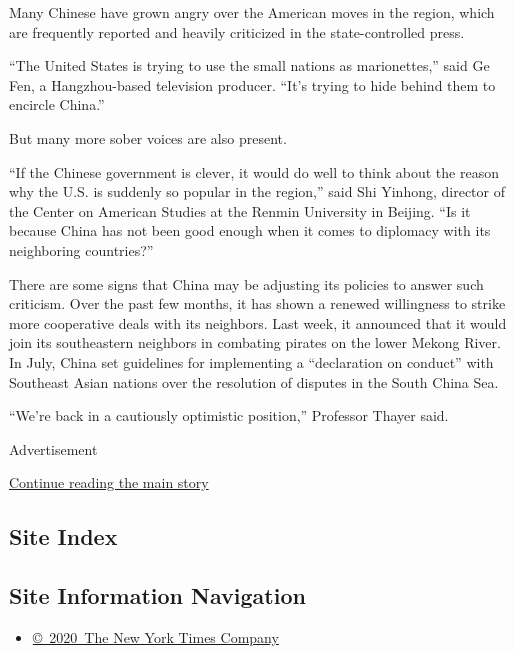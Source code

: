 Many Chinese have grown angry over the American moves in the region,
which are frequently reported and heavily criticized in the
state-controlled press.

``The United States is trying to use the small nations as marionettes,''
said Ge Fen, a Hangzhou-based television producer. ``It's trying to hide
behind them to encircle China.''

But many more sober voices are also present.

``If the Chinese government is clever, it would do well to think about
the reason why the U.S. is suddenly so popular in the region,'' said Shi
Yinhong, director of the Center on American Studies at the Renmin
University in Beijing. ``Is it because China has not been good enough
when it comes to diplomacy with its neighboring countries?''

There are some signs that China may be adjusting its policies to answer
such criticism. Over the past few months, it has shown a renewed
willingness to strike more cooperative deals with its neighbors. Last
week, it announced that it would join its southeastern neighbors in
combating pirates on the lower Mekong River. In July, China set
guidelines for implementing a ``declaration on conduct'' with Southeast
Asian nations over the resolution of disputes in the South China Sea.

``We're back in a cautiously optimistic position,'' Professor Thayer
said.

Advertisement

\protect\hyperlink{after-bottom}{Continue reading the main story}

\hypertarget{site-index}{%
\subsection{Site Index}\label{site-index}}

\hypertarget{site-information-navigation}{%
\subsection{Site Information
Navigation}\label{site-information-navigation}}

\begin{itemize}
\tightlist
\item
  \href{https://help.nytimes3xbfgragh.onion/hc/en-us/articles/115014792127-Copyright-notice}{©~2020~The
  New York Times Company}
\end{itemize}

